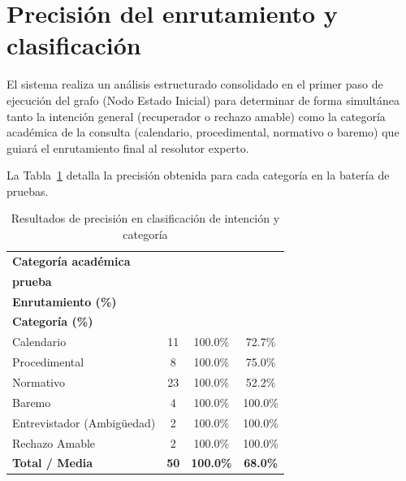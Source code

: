 \documentclass[12pt,a4paper,oneside]{report}
\begin{document}
\section{Precisión del enrutamiento y clasificación}

El sistema realiza un análisis estructurado consolidado en el primer paso de ejecución del grafo (Nodo Estado Inicial) para determinar de forma simultánea tanto la intención general (recuperador o rechazo amable) como la categoría académica de la consulta (calendario, procedimental, normativo o baremo) que guiará el enrutamiento final al resolutor experto.

La Tabla~\ref{tab:routing_results} detalla la precisión obtenida para cada categoría en la batería de pruebas.

\begin{table}[H]
    \centering
    \caption{Resultados de precisión en clasificación de intención y categoría}
    \begin{tabular}{@{}lccc@{}}
        \toprule
        \textbf{Categoría académica} & \shortstack{\textbf{Casos de}\\\textbf{prueba}} & \shortstack{\textbf{Precisión}\\\textbf{Enrutamiento (\%)}} & \shortstack{\textbf{Precisión}\\\textbf{Categoría (\%)}} \\
        \midrule
        Calendario                  & 11                       & 100.0\%                              & 72.7\%                            \\
        Procedimental               & 8                        & 100.0\%                              & 75.0\%                            \\
        Normativo                   & 23                       & 100.0\%                              & 52.2\%                            \\
        Baremo                      & 4                        & 100.0\%                              & 100.0\%                           \\
        Entrevistador (Ambigüedad)  & 2                        & 100.0\%                              & 100.0\%                           \\
        Rechazo Amable              & 2                        & 100.0\%                              & 100.0\%                           \\
        \midrule
        \textbf{Total / Media}      & \textbf{50}              & \textbf{100.0\%}                     & \textbf{68.0\%}                   \\
        \bottomrule
    \end{tabular}
    \label{tab:routing_results}
\end{table}
\end{document}
